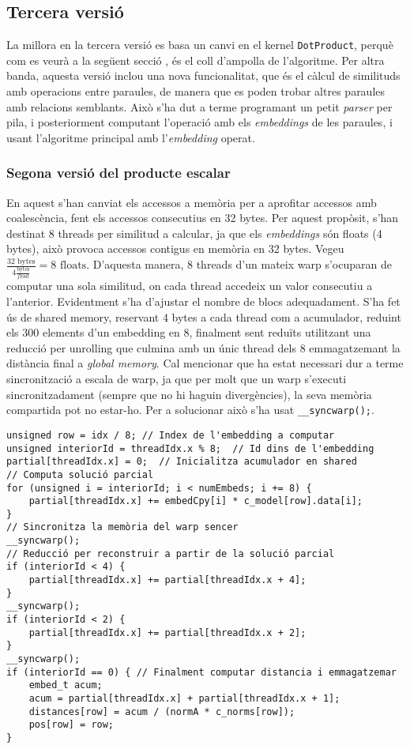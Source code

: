 \documentclass[catalan,10pt,a4paper]{article}
\begin{document}
\subsection*{Tercera versió}\label{sec:v3}
La millora en la tercera versió es basa un canvi en el kernel \verb|DotProduct|, perquè com es veurà a la següent secció , és el coll d'ampolla de l'algoritme. 
Per altra banda, aquesta versió inclou una nova funcionalitat, que és el càlcul de similituds amb operacions entre paraules, de manera que es poden trobar altres paraules amb relacions semblants. Això s'ha dut a terme programant un petit \textit{parser} per pila, i posteriorment computant l'operació amb els \textit{embeddings} de les paraules, i usant l'algoritme principal amb l'\textit{embedding} operat. 
\subsubsection*{Segona versió del producte escalar}
En aquest s'han canviat els accessos a memòria per a aprofitar accessos amb coalescència, fent els accessos consecutius en 32 bytes. Per aquest propòsit, s'han destinat 8 threads per similitud a calcular, ja que els \textit{embeddings} són floats (4 bytes), això provoca accessos contigus en memòria en 32 bytes. Vegeu $\frac{32 \text{ bytes}}{4 \frac{\text{bytes}}{float}} = 8 \text{ floats}$. D'aquesta manera, 8 threads d'un mateix warp s'ocuparan de computar una sola similitud, on cada thread accedeix un valor consecutiu a l'anterior. Evidentment s'ha d'ajustar el nombre de blocs adequadament.
S'ha fet ús de shared memory, reservant 4 bytes a cada thread com a acumulador, reduint els 300 elements d'un embedding en 8, finalment sent reduïts utilitzant una reducció per unrolling que culmina amb un únic thread dels 8 emmagatzemant la distància final a \textit{global memory}.
Cal mencionar que ha estat necessari dur a terme sincronització a escala de warp, ja que per molt que un warp s'executi sincronitzadament (sempre que no hi haguin divergències), la seva memòria compartida pot no estar-ho. Per a solucionar això s'ha usat \verb|__syncwarp();|.
\begin{verbatim}
unsigned row = idx / 8; // Index de l'embedding a computar
unsigned interiorId = threadIdx.x % 8;  // Id dins de l'embedding
partial[threadIdx.x] = 0;  // Inicialitza acumulador en shared
// Computa solució parcial
for (unsigned i = interiorId; i < numEmbeds; i += 8) {
	partial[threadIdx.x] += embedCpy[i] * c_model[row].data[i];
}
// Sincronitza la memòria del warp sencer
__syncwarp();
// Reducció per reconstruir a partir de la solució parcial
if (interiorId < 4) {
	partial[threadIdx.x] += partial[threadIdx.x + 4];
}
__syncwarp();
if (interiorId < 2) {
	partial[threadIdx.x] += partial[threadIdx.x + 2];
}
__syncwarp();
if (interiorId == 0) { // Finalment computar distancia i emmagatzemar
	embed_t acum;
	acum = partial[threadIdx.x] + partial[threadIdx.x + 1];
	distances[row] = acum / (normA * c_norms[row]);
	pos[row] = row;
}
\end{verbatim}
\end{document}
